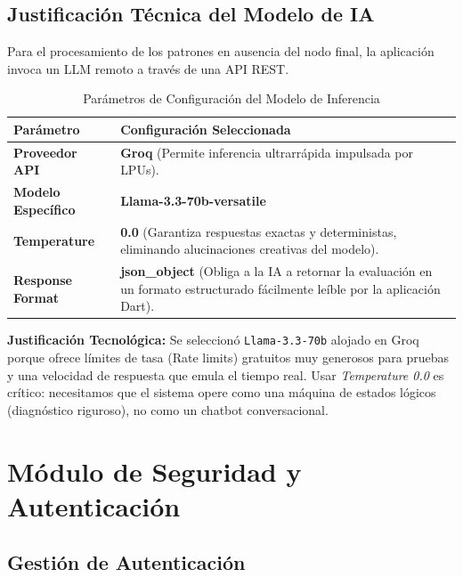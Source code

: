 \documentclass[11pt,a4paper]{article}
\begin{document}
\subsection{Justificación Técnica del Modelo de IA}

Para el procesamiento de los patrones en ausencia del nodo final, la aplicación invoca un LLM remoto a través de una API REST.

\begin{table}[htpb]
    \centering
    \caption{Parámetros de Configuración del Modelo de Inferencia}
    \begin{tabularx}{\textwidth}{>{\bfseries}l X}
        \toprule
        Parámetro & Configuración Seleccionada \\
        \midrule
        Proveedor API & \textbf{Groq} (Permite inferencia ultrarrápida impulsada por LPUs). \\
        Modelo Específico & \textbf{Llama-3.3-70b-versatile} \\
        Temperature & \textbf{0.0} (Garantiza respuestas exactas y deterministas, eliminando alucinaciones creativas del modelo). \\
        Response Format & \textbf{json\_object} (Obliga a la IA a retornar la evaluación en un formato estructurado fácilmente leíble por la aplicación Dart). \\
        \bottomrule
    \end{tabularx}
\end{table}

\textbf{Justificación Tecnológica:} Se seleccionó \texttt{Llama-3.3-70b} alojado en Groq porque ofrece límites de tasa (Rate limits) gratuitos muy generosos para pruebas y una velocidad de respuesta que emula el tiempo real. Usar \textit{Temperature 0.0} es crítico: necesitamos que el sistema opere como una máquina de estados lógicos (diagnóstico riguroso), no como un chatbot conversacional.

\section{Módulo de Seguridad y Autenticación}

\subsection{Gestión de Autenticación}
\end{document}
